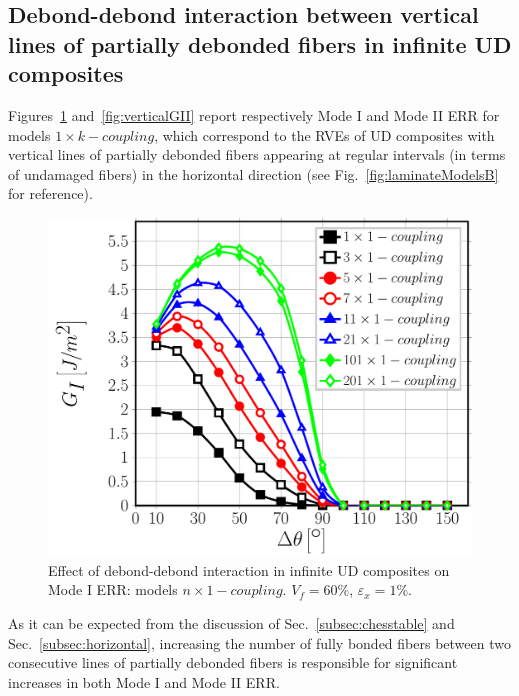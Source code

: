 \documentclass[review]{elsarticle}
\begin{document}
\subsection{Debond-debond interaction between vertical lines of partially debonded fibers in infinite UD composites}

Figures~\ref{fig:verticalGI} and~\ref{fig:verticalGII} report respectively Mode I and Mode II ERR for models $1\times k-coupling$, which correspond to the RVEs of UD composites with vertical lines of partially debonded fibers appearing at regular intervals (in terms of undamaged fibers) in the horizontal direction (see Fig.~\ref{fig:laminateModelsB} for reference). 

\begin{figure}[!h]
\centering
\includegraphics[width=\textwidth]{nx1-coupling-vf60-GI.pdf}
\caption{Effect of debond-debond interaction in infinite UD composites on Mode I ERR: models $n\times 1-coupling$. $V_{f}=60\%$, $\varepsilon_{x}=1\%$.}\label{fig:verticalGI}
\end{figure}

As it can be expected from the discussion of Sec.~\ref{subsec:chesstable} and Sec.~\ref{subsec:horizontal}, increasing the number of fully bonded fibers between two consecutive lines of partially debonded fibers is responsible for significant increases in both Mode I and Mode II ERR.
\end{document}
